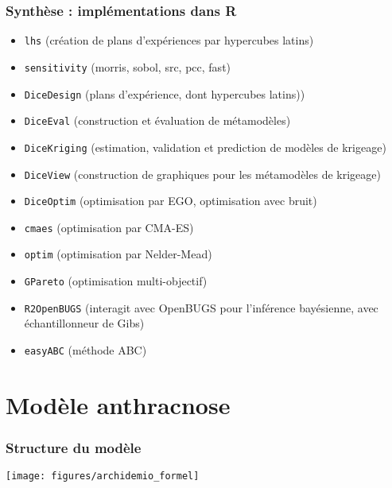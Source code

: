 \documentclass[10pt]{beamer}
\begin{document}
\begin{frame}
\frametitle{Synthèse : implémentations dans R}

\begin{itemize}
	\item \texttt{lhs} (création de plans d'expériences par hypercubes latins)
	\item \texttt{sensitivity} (morris, sobol, src, pcc, fast)
	\item \texttt{DiceDesign} (plans d'expérience, dont hypercubes latins))
	\item \texttt{DiceEval} (construction et évaluation de métamodèles)
	\item \texttt{DiceKriging} (estimation, validation et prediction de modèles de krigeage)
	\item \texttt{DiceView} (construction de graphiques pour les métamodèles de krigeage)
	\item \texttt{DiceOptim} (optimisation par EGO, optimisation avec bruit)
	\item \texttt{cmaes} (optimisation par CMA-ES)
	\item \texttt{optim} (optimisation par Nelder-Mead)
	\item \texttt{GPareto} (optimisation multi-objectif)
	\item \texttt{R2OpenBUGS} (interagit avec OpenBUGS pour l'inférence bayésienne, avec échantillonneur de Gibs)
	\item \texttt{easyABC} (méthode ABC)
\end{itemize}

\end{frame}

\section{Modèle anthracnose}

\begin{frame}
\frametitle{Structure du modèle}

\begin{center}
	\texttt{[image: figures/archidemio\_formel]}
\end{center}

\end{frame}
\end{document}
